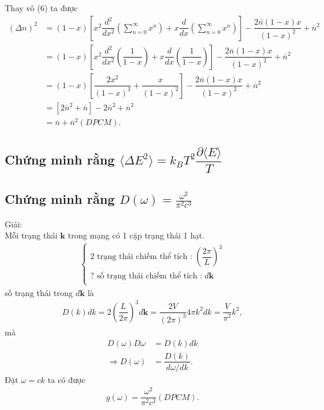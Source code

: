 \documentclass{article}
\newcommand{\f}[2]{\dfrac{#1}{#2}}
\begin{document}
Thay vô (6) ta được
\begin{align*}
	(\Delta n)^2 
	&= (1-x) \left[x^2 \f{d^2}{dx^2} \left( \sum_{n = 0}^{\infty} x^{n} \right) + x \f{d}{dx} \left( \sum_{n = 0}^{\infty} x^{n} \right)\right] - \f{2\overline{n}(1-x)x}{(1 - x)^2} + \overline{n}^2 \\
	&= (1-x) \left[x^2 \f{d^2}{dx^2} \left( \f{1}{1 - x} \right) + x \f{d}{dx} \left( \f{1}{1 - x} \right)\right] - \f{2\overline{n}(1-x)x}{(1 - x)^2} + \overline{n}^2 \\
	&= (1-x) \left[\f{2x^2}{(1-x)^3} + \f{x}{(1 - x)^2}\right] - \f{2\overline{n}(1-x)x}{(1 - x)^2} + \overline{n}^2 \\
	&= \left[2 \overline{n}^2 + \overline{n}\right] - 2 \overline{n}^2 + \overline{n}^2 \\
	&= \overline{n} + \overline{n}^2 (DPCM).\tag{9}
\end{align*}

\subsection*{Chứng minh rằng $\langle \Delta E^2 \rangle = k_B T^2 \f{\partial \langle E \rangle}{T}$}

\subsection*{Chứng minh rằng $D(\omega) = \frac{\omega^2}{\pi^2 c^3}$}
Giải:\\
Mỗi trạng thái $\mathbf{k}$ trong mạng có 1 cặp trạng thái 1 hạt.
\begin{align*}
	\begin{cases}
		\text{2 trạng thái chiếm thể tích :} \; \left(\f{2\pi}{L}\right)^3 \\
		\text{? số trạng thái chiếm thể tích :} \; d\mathbf{k} \\
	\end{cases}
\end{align*}
số trạng thái trong $d\mathbf{k}$ là 
\begin{align*}
	D(k)dk = 2  \left(\f{L}{2\pi}\right)^3 d\mathbf{k} = \f{2V}{(2\pi)^3} 4\pi k^2 dk = \f{V}{\pi^2}k^2,
\end{align*}
mà
\begin{align*}
	D(\omega) D\omega &= D(k) dk\\
	\Rightarrow D(\omega) &= \f{D(k)}{d\omega / dk}.
\end{align*}
Đặt $\omega = ck$ ta có được
\begin{align*}
	g(\omega) = \f{\omega^2}{\pi^2 c^3} (DPCM).
\end{align*}
\end{document}

